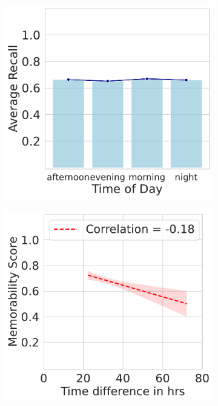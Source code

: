 \begin{landscape}
\begin{figure}[]
\begin{subfigure}{0.3\textwidth}
        \caption{}
        \label{subfig:velocity vs recall}
    \end{subfigure}
    \begin{subfigure}{0.3\textwidth}
        \centering
        \includegraphics[width=\textwidth]{images/avg_recall_by_time.pdf}
        \caption{}
        \label{subfig:avg recall by time}
    \end{subfigure}
      \begin{subfigure}{0.3\textwidth}
        \centering
        \includegraphics[width=\textwidth]{images/delay_vs_recall.pdf}

\end{subfigure}
\end{figure}
\end{landscape}
